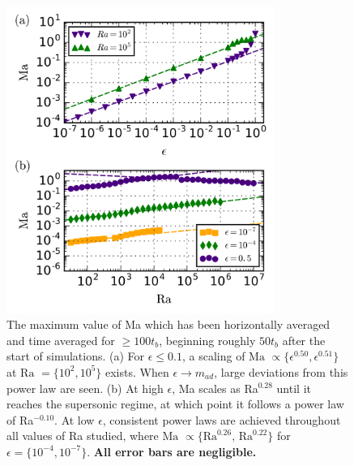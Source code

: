 \documentclass[aps, prl, twocolumn, nofootinbib, groupedaddress, amsfonts, amssymb, amsmath]{revtex4-1}
\begin{document}
\begin{figure}[t]
\includegraphics[width=3.4375in]{./figs/ma_v_eps.png}
\caption{The maximum value of Ma which has been horizontally averaged and time averaged for $\geq 100 t_b$, 
beginning roughly $50t_b$ after
the start of simulations.  (a) For $\epsilon \leq 0.1$,
a scaling of $\text{Ma }\propto \{\epsilon^{0.50}, \epsilon^{0.51}\}$ 
at $\text{Ra }= \{10^2, 10^5\}$ exists.
When $\epsilon \rightarrow m_{ad}$, large deviations from this power law are seen.  
(b) At high $\epsilon$, Ma scales as Ra$^{0.28}$ until it reaches the supersonic regime, at which point it
follows a power law of Ra$^{-0.10}$.  At low $\epsilon$, consistent power laws are achieved throughout all
values of Ra studied, where $\text{Ma }\propto \{\text{Ra}^{0.26},\,\text{Ra}^{0.22}\}$
for $\epsilon = \{10^{-4}, 10^{-7}\}$. \textbf{All
error bars are negligible.}  \label{fig:ma_v_eps} }
\end{figure}
\end{document}
